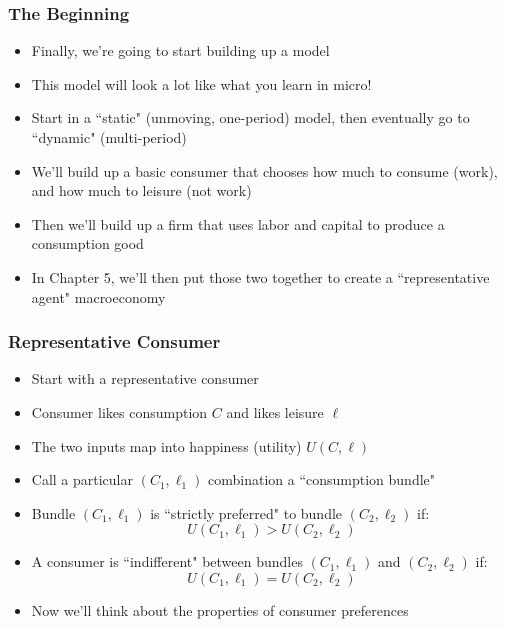\documentclass{beamer}
\author{Trevor S. Gallen}
\date{}
\begin{document}
\renewcommand*{\inserttotalframenumber}{\pageref{lastframe}}



\begin{frame}
\titlepage
\end{frame}

\begin{frame}
\frametitle[alignment=center]{The Beginning}
\begin{itemize}
\item Finally, we're going to start building up a model
\bigskip
\item This model will look a lot like what you learn in micro!  
\bigskip
\item Start in a ``static" (unmoving, one-period) model, then eventually go to ``dynamic" (multi-period)
\bigskip
\item We'll build up a basic consumer that chooses how much to consume (work), and how much to leisure (not work)
\bigskip
\item Then we'll build up a firm that uses labor and capital to produce a consumption good
\bigskip
\item In Chapter 5, we'll then put those two together to create a ``representative agent" macroeconomy
\end{itemize}
\end{frame}

\begin{frame}
\frametitle[alignment=center]{Representative Consumer}
\begin{itemize}
\item Start with a representative consumer
\bigskip
\item Consumer likes consumption $C$ and likes leisure $\ell$
\bigskip
\item The two inputs map into happiness (utility) $U(C,\ell)$
\bigskip
\item  Call a particular $(C_1,\ell_1)$ combination a ``consumption bundle"
\bigskip
\item Bundle $(C_1,\ell_1)$ is ``strictly preferred" to bundle $(C_2,\ell_2)$ if:
$$U(C_1,\ell_1)>U(C_2,\ell_2)$$
\item A consumer is ``indifferent" between bundles  $(C_1,\ell_1)$ and $(C_2,\ell_2)$ if:
$$U(C_1,\ell_1)=U(C_2,\ell_2)$$
\item Now we'll think about the properties of consumer preferences
\end{itemize}
\end{frame}
\end{document}
